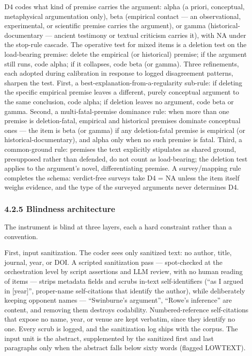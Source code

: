 D4 codes what kind of premise carries the argument: alpha (a priori, conceptual, metaphysical argumentation only), beta (empirical contact --- an observational, experimental, or scientific premise carries the argument), or gamma (historical-documentary --- ancient testimony or textual criticism carries it), with NA under the stop-rule cascade. The operative test for mixed items is a deletion test on the load-bearing premise: delete the empirical (or historical) premise; if the argument still runs, code alpha; if it collapses, code beta (or gamma). Three refinements, each adopted during calibration in response to logged disagreement patterns, sharpen the test. First, a best-explanation-from-a-regularity sub-rule: if deleting the specific empirical premise leaves a different, purely conceptual argument to the same conclusion, code alpha; if deletion leaves no argument, code beta or gamma. Second, a multi-fatal-premise dominance rule: when more than one premise is deletion-fatal, empirical and historical premises dominate conceptual ones --- the item is beta (or gamma) if any deletion-fatal premise is empirical (or historical-documentary), and alpha only when no such premise is fatal. Third, a common-ground rule: premises the text explicitly stipulates as shared ground, presupposed rather than defended, do not count as load-bearing; the deletion test applies to the argument's novel, differentiating premise. A survey/mapping rule completes the schema: verdict-free surveys take D4 = NA unless the item itself weighs evidence, and the type of the surveyed arguments never determines D4.

\subsubsection{4.2.5 Blindness architecture}\label{blindness-architecture}

The instrument is blind at three layers, each a hard constraint rather than a convention.

First, input sanitization. The coder sees only sanitized text: no author, title, journal, year, or DOI. A scripted sanitization pass --- spot-checked at the orchestration level by script assertions and LLM review, with no human reading of items --- strips metadata fields and scrubs in-text self-identifiers (``as I argued in {[}year{]}'', proper-name self-citations that identify the author), while deliberately keeping opponent names --- ``Swinburne's argument'', ``Rowe's inference'' are content, and removing them destroys codability. Numbered-reference self-citations that expose no name, year, or venue are kept verbatim, since they identify no one. Every scrub is logged, and the sanitization log ships with the corpus. The input unit is the abstract, supplemented by the sanitized first and last paragraphs only when the abstract falls below sixty words (flagged LOWTEXT).

